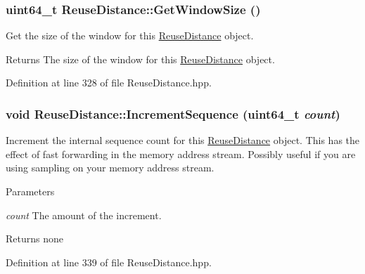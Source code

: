 \hypertarget{class_reuse_distance_a174706aa3697f068cc4d1534948d7786}{
\subsubsection[{GetWindowSize}]{\setlength{\rightskip}{0pt plus 5cm}uint64\_\-t ReuseDistance::GetWindowSize ()}}
\label{class_reuse_distance_a174706aa3697f068cc4d1534948d7786}
Get the size of the window for this \hyperlink{class_reuse_distance}{ReuseDistance} object.

\begin{DoxyReturn}{Returns}
The size of the window for this \hyperlink{class_reuse_distance}{ReuseDistance} object. 
\end{DoxyReturn}


Definition at line 328 of file ReuseDistance.hpp.

\hypertarget{class_reuse_distance_a0c6e2709575d716c1ac659a266164163}{
\subsubsection[{IncrementSequence}]{\setlength{\rightskip}{0pt plus 5cm}void ReuseDistance::IncrementSequence (uint64\_\-t {\em count})}}
\label{class_reuse_distance_a0c6e2709575d716c1ac659a266164163}
Increment the internal sequence count for this \hyperlink{class_reuse_distance}{ReuseDistance} object. This has the effect of fast forwarding in the memory address stream. Possibly useful if you are using sampling on your memory address stream.


\begin{DoxyParams}{Parameters}
\item[{\em count}]The amount of the increment.\end{DoxyParams}
\begin{DoxyReturn}{Returns}
none 
\end{DoxyReturn}


Definition at line 339 of file ReuseDistance.hpp.

